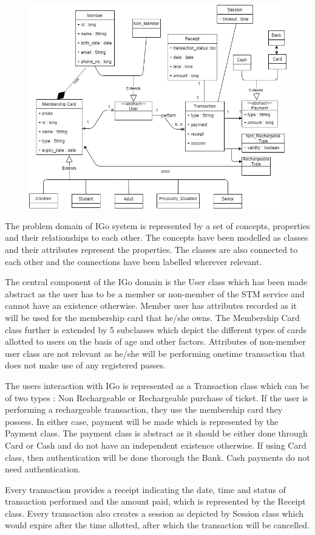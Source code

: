\documentclass[11pt]{article}
\begin{document}
\begin{figure}

\begin{center}

\includegraphics[scale=0.6]{./DomainModel}

\end{center}

\end{figure}

The problem domain of IGo system is represented by a set of concepts, properties and their relationships to each other. The concepts have been modelled as classes and their attributes represent the properties. The classes are also connected to each other and the connections have been labelled wherever relevant.

The central component of the IGo domain is the User class which has been made abstract as the user has to be a member or non-member of the STM service and cannot have an existence otherwise. Member user has attributes recorded as it will be used for the membership card that he/she owns. The Membership Card class further is extended by 5 subclasses which depict the different types of cards allotted to users on the basis of age and other factors. Attributes of non-member user class are not relevant as he/she will be performing onetime transaction that does not make use of any registered passes.

The users interaction with IGo is represented as a Transaction  class which can be of two types : Non Rechargeable or Rechargeable purchase of ticket. If the user is performing a rechargeable transaction, they use the membership card they possess. In either case, payment will be made which is represented by the Payment class. The payment class is abstract as it should be either done through Card or Cash and do not have an independent existence otherwise. If using Card class, then authentication will be done thorough the Bank. Cash payments do not need authentication.

Every transaction provides a receipt indicating the date, time and status of transaction performed and the amount paid, which is represented by the Receipt class. Every transaction also creates a session as depicted by Session class which would expire after the time allotted, after which the transaction will be cancelled.
\end{document}
